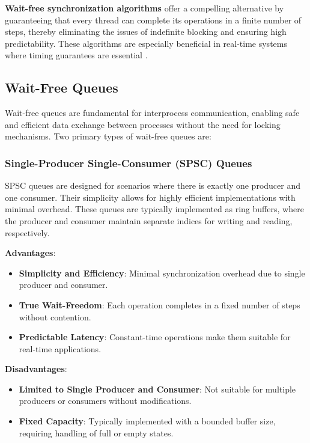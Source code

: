 \documentclass[ a4paper,
                toc=bibliography
              ]{scrartcl}
\begin{document}
\textbf{Wait-free synchronization algorithms} offer a compelling alternative by guaranteeing that every thread can complete its operations in a finite number of steps, thereby eliminating the issues of indefinite blocking and ensuring high predictability. These algorithms are especially beneficial in real-time systems where timing guarantees are essential \cite{kogan2012methodology,herlihy1991wait}.

\subsection{Wait-Free Queues}

Wait-free queues are fundamental for interprocess communication, enabling safe and efficient data exchange between processes without the need for locking mechanisms. Two primary types of wait-free queues are:

\subsubsection{Single-Producer Single-Consumer (SPSC) Queues}

SPSC queues are designed for scenarios where there is exactly one producer and one consumer. Their simplicity allows for highly efficient implementations with minimal overhead. These queues are typically implemented as ring buffers, where the producer and consumer maintain separate indices for writing and reading, respectively.

\textbf{Advantages}:
\begin{itemize}
	\item \textbf{Simplicity and Efficiency}: Minimal synchronization overhead due to single producer and consumer.
	\item \textbf{True Wait-Freedom}: Each operation completes in a fixed number of steps without contention.
	\item \textbf{Predictable Latency}: Constant-time operations make them suitable for real-time applications.
\end{itemize}

\textbf{Disadvantages}:
\begin{itemize}
	\item \textbf{Limited to Single Producer and Consumer}: Not suitable for multiple producers or consumers without modifications.
	\item \textbf{Fixed Capacity}: Typically implemented with a bounded buffer size, requiring handling of full or empty states.
\end{itemize}
\cite{dolz2016SPSC,torquati2010singleproducersingleconsumerqueuessharedcache}
\end{document}
